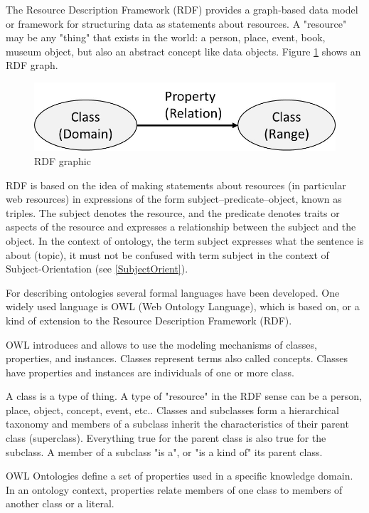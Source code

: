 The Resource Description Framework (RDF)\cite{rdf:rdf} provides a graph-based data model or framework for structuring data as statements about resources. A "resource" may be any "thing" that exists in the world: a person, place, event, book, museum object, but also an abstract concept like data objects. Figure \ref{fig:classes-properties}  shows an RDF graph.

\begin{figure}[h]
	\centering
	\includegraphics[width=0.6\linewidth]{Figures/Ontology/Introduction/Classes-Properties}
	\caption[RDF graphic]{RDF graphic}
	\label{fig:classes-properties}
\end{figure}

RDF is based on the idea of making statements about resources (in particular web resources) in expressions of the form subject–predicate–object, known as triples. The subject denotes the resource, and the predicate denotes traits or aspects of the resource and expresses a relationship between the subject and the object. In the context of ontology, the term subject expresses what the sentence is about (topic), it must not be confused with term subject in the context of Subject-Orientation (see \ref{SubjectOrient}).

For describing ontologies several formal languages have been developed. One widely used language is OWL (Web Ontology Language)\cite{w3c:owl}, which is based on, or a kind of extension to the Resource Description Framework (RDF).

OWL introduces and allows to use the modeling mechanisms of classes, properties, and instances. Classes represent terms also called concepts. Classes have properties and instances are individuals of one or more class.

A class is a type of thing. A type of "resource" in the RDF sense can be a person, place, object, concept, event, etc.. Classes and subclasses form a hierarchical taxonomy and members of a subclass inherit the characteristics of their parent class (superclass). Everything true for the parent class is also true for the subclass. A member of a subclass "is a", or "is a kind of" its parent class.

OWL Ontologies define a set of properties used in a specific knowledge domain. In an ontology context, properties relate members of one class to members of another class or a literal.

